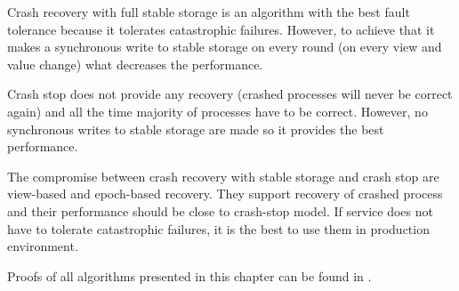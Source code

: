 Crash recovery with full stable storage is an algorithm with the best fault tolerance because it tolerates catastrophic failures. However, to achieve that it makes a synchronous write to stable storage on every round (on every view and value change) what decreases the performance.

Crash stop does not provide any recovery (crashed processes will never be correct again) and all the time majority of processes have to be correct. However, no synchronous writes to stable storage are made so it provides the best performance.

The compromise between crash recovery with stable storage and crash stop are view-based and epoch-based recovery. They support recovery of crashed process and their performance should be close to crash-stop model. If service does not have to tolerate catastrophic failures, it is the best to use them in production environment.

Proofs of all algorithms presented in this chapter can be found in \cite{Nun10}. 
